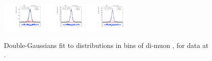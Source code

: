 \begin{figure}[htb]
\includegraphics[width=0.19\textwidth]{plots/Appendix_Recoil_Fits/ZmmData_PF_13TeV_2G_bkg/pfu2fit_32.pdf}
\includegraphics[width=0.19\textwidth]{plots/Appendix_Recoil_Fits/ZmmData_PF_13TeV_2G_bkg/pfu2fit_33.pdf}
\includegraphics[width=0.19\textwidth]{plots/Appendix_Recoil_Fits/ZmmData_PF_13TeV_2G_bkg/pfu2fit_34.pdf}
\caption{Double-Gaussians fit to \uprp distributions in bins of di-muon \pt, for \zmm data at \serah.}
\label{fig:a:recoil:fit:data:u2:13}
\end{figure}